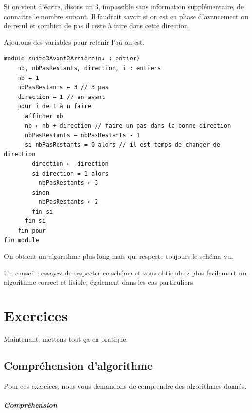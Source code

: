 \documentclass[11pt,a4paper]{article}
\begin{document}
            \par
        
        Si on vient d'\'ecrire, disons un 3, impossible sans information suppl\'ementaire, de connaitre
        le nombre suivant. Il faudrait savoir si on est en phase d'avancement ou de recul et combien
        de pas il reste \`a faire dans cette direction.
      
            \par
        
        Ajoutons des variables pour retenir l' o\`u on est.
      
            \par
        \begin{verbatim}
module suite3Avant2Arrière(n↓ : entier)
    nb, nbPasRestants, direction, i : entiers
    nb ← 1
    nbPasRestants ← 3 // 3 pas
    direction ← 1 // en avant
    pour i de 1 à n faire
      afficher nb
      nb ← nb + direction // faire un pas dans la bonne direction
      nbPasRestants ← nbPasRestants - 1
      si nbPasRestants = 0 alors // il est temps de changer de direction
        direction ← -direction
        si direction = 1 alors
          nbPasRestants ← 3
        sinon
          nbPasRestants ← 2
        fin si
      fin si
    fin pour
fin module
      \end{verbatim}
        On obtient un algorithme plus long mais qui respecte toujours le sch\'ema vu.
      
            \par
        
        Un conseil : essayez de respecter ce sch\'ema et vous obtiendrez plus facilement un algorithme
        correct et lisible, \'egalement dans les cas particuliers.
      
            \par
        \section{Exercices}
				Maintenant, mettons tout \c ca en pratique.
      
            \par
        \subsection{Compr\'ehension d'algorithme}
          Pour ces exercices, nous vous demandons de comprendre des algorithmes donn\'es. 
          
			
		\subparagraph{Compr\'ehension} 
		
\end{document}
